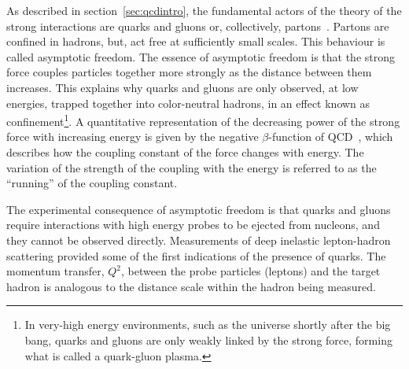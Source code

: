 As described in section~\ref{sec:qcdintro}, the fundamental actors of the theory of the strong interactions are quarks and gluons or, collectively, partons~\cite{PhysRevLett.23.1415}. Partons are confined in  %
hadrons, but, act free at sufficiently small scales. This behaviour is called asymptotic freedom. The essence of asymptotic freedom is that the strong force couples particles together more strongly as the distance between them increases. This explains why quarks and gluons are only observed, at low energies, trapped together into color-neutral hadrons, in an effect known as confinement\footnote{In very-high energy environments, such as the universe shortly after the big bang, quarks and gluons are only weakly linked by the strong force, forming what is called a quark-gluon plasma.}.  A quantitative representation of the decreasing power of the strong force with increasing energy is given by the negative $\beta$-function of QCD~\cite{PhysRevLett.30.1346,PhysRevLett.30.1343}, 
which describes how the coupling constant of the force changes with energy. The variation of the strength of the coupling with the energy is referred to as the ``running'' of the coupling constant.

The experimental consequence of asymptotic freedom is that quarks and gluons require interactions with high energy probes to be ejected from nucleons, and they cannot be observed directly. 
Measurements of deep inelastic lepton-hadron scattering provided some of the first indications of the presence of quarks. The momentum transfer, $Q^2$, between the probe particles (leptons) and the target hadron is analogous to the distance scale within the hadron being measured. 


